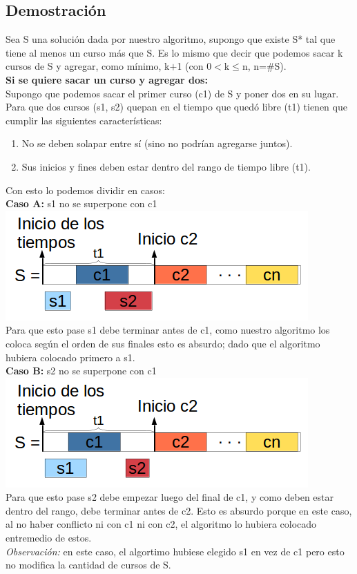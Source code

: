 \subsection{Demostraci\'on}

Sea S una solución dada por nuestro algoritmo, supongo que existe S* tal que tiene al menos un curso más que S. Es lo mismo que decir que podemos sacar k cursos de S y agregar, como mínimo, k$+$1 (con 0$<$k$\leq$n, n=$\#$S).\\

\textbf{Si se quiere sacar un curso y agregar dos:}\\
Supongo que podemos sacar el primer curso (c1) de S y poner dos en su lugar. Para que dos cursos (s1, s2) quepan en el tiempo que quedó libre (t1) tienen que cumplir las siguientes características:
\begin{enumerate}
\item No se deben solapar entre sí (sino no podrían agregarse juntos).
\item Sus inicios y fines deben estar dentro del rango de tiempo libre (t1).
\end{enumerate}
Con esto lo podemos dividir en casos:\\

\textbf{Caso A:} s1 no se superpone con c1\\
\includegraphics[scale=0.8]{ej2/Graficos/casoA.png}\\
Para que esto pase s1 debe terminar antes de c1, como nuestro algoritmo los coloca según el orden de sus finales esto es absurdo; dado que el algoritmo hubiera colocado primero a s1. \\

\textbf{Caso B:} s2 no se superpone con c1\\
\includegraphics[scale=0.8]{ej2/Graficos/casoB.png}\\
Para que esto pase s2 debe empezar luego del final de c1, y como deben estar dentro del rango, debe terminar antes de c2. Esto es absurdo porque en este caso, al no haber conflicto ni con c1 ni con c2, el algoritmo lo hubiera colocado entremedio de estos.\\
\textit{Observación:} en este caso, el algortimo hubiese elegido s1 en vez de c1 pero esto no modifica la cantidad de cursos de S.\\

